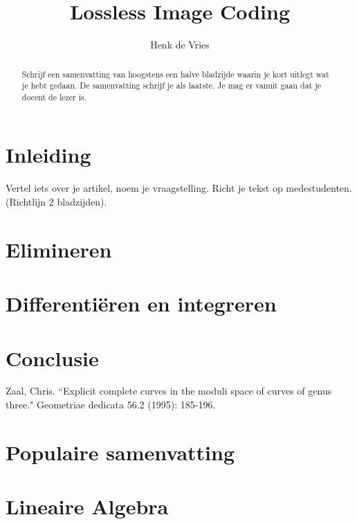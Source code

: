 \documentclass[dubaWN]{uvamath}%
\title{Lossless Image Coding}
\author[henk@science.uva.nl, 6127901]{Henk de Vries}
\begin{document}
\maketitle

\begin{abstract}
Schrijf een samenvatting van hoogstens een halve bladzijde waarin je kort uitlegt wat je hebt gedaan. De samenvatting schrijf je als laatste. Je mag er vanuit gaan dat je docent de lezer is.
\end{abstract}

\tableofcontents

\chapter{Inleiding}
Vertel iets over je artikel, noem je vraagstelling. Richt je tekst op medestudenten. (Richtlijn 2 bladzijden).

\chapter{Elimineren}
\lipsum[1-3]

\chapter{Differenti\"eren en integreren}
\lipsum[1-3]

\chapter{Conclusie}
\lipsum[1-3]

\clearpage%
\begin{thebibliography}{}
Zaal, Chris. ``Explicit complete curves in the moduli space of curves of genus three." Geometriae dedicata 56.2 (1995): 185-196.
\end{thebibliography}

\clearpage%
\chapter*{Populaire samenvatting}
\lipsum[1-2]

\appendix

\chapter{Lineaire Algebra}
\lipsum[1-3]
\end{document}
